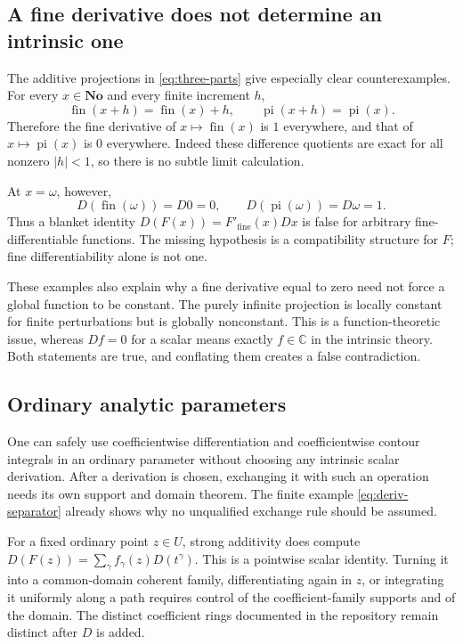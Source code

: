 \documentclass[11pt,a4paper]{article}
\numberwithin{equation}{section}
\theoremstyle{definition}
\theoremstyle{remark}
\newcommand{\No}{\mathbf{No}}
\newcommand{\C}{\mathbb C}
\newcommand{\fin}{\operatorname{fin}}
\newcommand{\pipart}{\operatorname{pi}}
\newcommand{\abs}[1]{\lvert #1\rvert}
\begin{document}
\subsection{A fine derivative does not determine an intrinsic one}

The additive projections in \eqref{eq:three-parts} give especially clear
counterexamples. For every $x\in\No$ and every finite increment $h$,
\[
 \fin(x+h)=\fin(x)+h,\qquad
 \pipart(x+h)=\pipart(x).
\]
Therefore the fine derivative of $x\mapsto\fin(x)$ is $1$ everywhere,
and that of $x\mapsto\pipart(x)$ is $0$ everywhere. Indeed these difference
quotients are exact for all nonzero $\abs h<1$, so there is no subtle
limit calculation.

At $x=\omega$, however,
\[
 D(\fin(\omega))=D0=0,\qquad
 D(\pipart(\omega))=D\omega=1.
\]
Thus a blanket identity $D(F(x))=F'_{\mathrm{fine}}(x)Dx$ is false for
arbitrary fine-differentiable functions. The missing hypothesis is a
compatibility structure for $F$; fine differentiability alone is not one.

These examples also explain why a fine derivative equal to zero need not
force a global function to be constant. The purely infinite projection is
locally constant for finite perturbations but is globally nonconstant.
This is a function-theoretic issue, whereas $Df=0$ for a scalar means
exactly $f\in\C$ in the intrinsic theory. Both statements are true, and
conflating them creates a false contradiction.

\subsection{Ordinary analytic parameters}

One can safely use coefficientwise differentiation and coefficientwise
contour integrals in an ordinary parameter without choosing any intrinsic
scalar derivation. After a derivation is chosen, exchanging it with such
an operation needs its own support and domain theorem. The finite example
\eqref{eq:deriv-separator} already shows why no unqualified exchange rule
should be assumed.

For a fixed ordinary point $z\in U$, strong additivity does compute
$D(F(z))=\sum_\gamma f_\gamma(z)D(t^\gamma)$. This is a pointwise scalar
identity. Turning it into a common-domain coherent family, differentiating
again in $z$, or integrating it uniformly along a path requires control of
the coefficient-family supports and of the domain. The distinct coefficient
rings documented in the repository remain distinct after $D$ is added.
\end{document}
